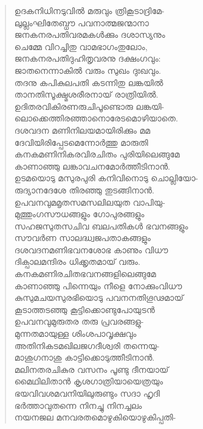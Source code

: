 \begin{verse}
ഉദകനിധിനടുവില്‍ മരുവും ത്രികൂടാദ്രിമേ-\\
ലുല്ലംഘിതേബ്ധൗ പവനാത്മജന്മാനാ\\
ജനകനരപതിവരമകള്‍ക്കും ദശാസ്യനും\\
ചെമ്മേ വിറച്ചിതു വാമഭാഗംതുലോം,\\
ജനകനരപതിദുഹിതൃവരനു ദക്ഷംഗവും:\\
ജാതനെന്നാകില്‍ വരും സുഖം ദുഃഖവും.\\
തദനു കപികുലപതി കടന്നിതു ലങ്കയില്‍\\
താനതിസൂക്ഷ്മശരീരനായ് രാത്രിയില്‍.\\
ഉദിതരവികിരണരുചിപൂണ്ടൊരു ലങ്കയി-\\
ലൊക്കെത്തിരഞ്ഞാനൊരേടമൊഴിയാതെ.\\
ദശവദന  മണിനിലയമായിരിക്കും മമ\\
ദേവിയിരിപ്പേടമെന്നോര്‍ത്തു മാരുതി\\
കനകമണിനികരവിരചിതം പുരിയിലെങ്ങുമേ\\
കാണാഞ്ഞു ലങ്കാവചനമോര്‍ത്തീടിനാന്‍.\\
ഉടമയൊടു മസുരപുരി കനിവിനൊടു ചൊല്ലിയോ-\\
രുദ്യാനദേശേ തിരഞ്ഞു തുടങ്ങിനാന്‍.\\
ഉപവനവുമമൃതസമസലിലയുത വാപിയു-\\
മുത്തുംഗസൗധങ്ങളും ഗോപുരങ്ങളും\\
സഹജസുതസചിവ ബലപതികള്‍ ഭവനങ്ങളും\\
സൗവര്‍ണ സാലദ്ധ്വജപതാകങ്ങളും\\
ദശവദനമണിഭവനശോഭ കാണും വിധൗ\\
ദിക്പാലമന്ദിരം ധിക്കൃതമായ് വരും.\\
കനകമണിരചിതഭവനങ്ങളിലെങ്ങുമേ\\
കാണാഞ്ഞു പിന്നെയും നീളെ നോക്കുംവിധൗ\\
കുസുമചയസുരഭിയൊടു പവനനതിഗൂഢമായ്\\
കൂടാത്തടഞ്ഞു കൂട്ടിക്കൊണ്ടുപോയുടന്‍\\
ഉപവനവുമുരുതര തരു പ്രവരങ്ങളു-\\
മുന്നതമായുള്ള ശിംശപാവൃക്ഷവും\\
അതിനികടമഖിലജഗദീശ്വരി തന്നെയു-\\
മാശുഗനാശു കാട്ടിക്കൊടുത്തീടിനാന്‍.\\
മലിനതരചികുര വസനം പൂണ്ടു ദീനയായ്\\
മൈഥിലിതാന്‍ കൃശഗാത്രിയായെത്രയും\\
ഭയവിവശമവനിയിലുരുണ്ടും സദാ ഹൃദി\\
ഭര്‍ത്താവുതന്നെ നിനച്ചു നിനച്ചലം\\
നയനജല മനവരതമൊഴുകിയൊഴുകിപ്പതി-\\

\end{verse}

